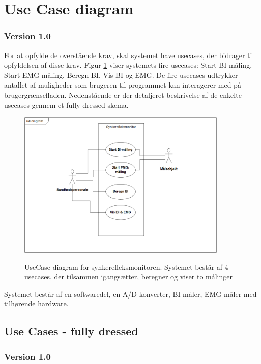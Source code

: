 \section{Use Case diagram}


\subsubsection{Version 1.0} 

For at opfylde de overstående krav, skal systemet have usecases, der bidrager til opfyldelsen af disse krav.
Figur \ref{UseCaseV1} viser systemets fire  usecases: Start BI-måling, Start EMG-måling, Beregn BI, Vis BI og EMG. De fire usecases udtrykker antallet af muligheder som brugeren til programmet kan interagerer med på brugergrænsefladen.  Nedenstående er der detaljeret beskrivelse af de enkelte usecases gennem et fully-dressed skema. 


\begin{figure}[H]
\centering
{\includegraphics[width=10cm]
{Figure/usecaseDiaV1}}
\caption{UseCase diagram for synkerefleksmonitoren. Systemet består af 4 usecases, der tilsammen igangsætter, beregner og viser to målinger}
\label{UseCaseV1}
\end{figure}







Systemet består af en softwaredel, en A/D-konverter, BI-måler, EMG-måler med tilhørende hardware.






\subsection{Use Cases - fully dressed}

\subsubsection{Version 1.0}

